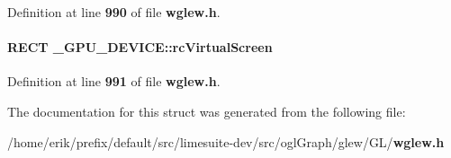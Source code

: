 Definition at line {\bf 990} of file {\bf wglew.\+h}.

\paragraph[{rc\+Virtual\+Screen}]{\setlength{\rightskip}{0pt plus 5cm}R\+E\+CT \+\_\+\+G\+P\+U\+\_\+\+D\+E\+V\+I\+C\+E\+::rc\+Virtual\+Screen}\label{struct__GPU__DEVICE_aeb573bbeb3b6c589246720ef259b9a27}


Definition at line {\bf 991} of file {\bf wglew.\+h}.



The documentation for this struct was generated from the following file\+:\begin{DoxyCompactItemize}
\item 
/home/erik/prefix/default/src/limesuite-\/dev/src/ogl\+Graph/glew/\+G\+L/{\bf wglew.\+h}\end{DoxyCompactItemize}
